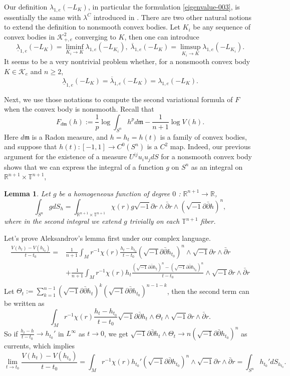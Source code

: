 \documentclass[reqno]{amsart}
\theoremstyle{remark}
\def\cK{{\mathcal K}}
\theoremstyle{plain}
\newtheorem{lemma}[thm]{Lemma}
\newcommand{\ddc}{\sqrt{-1}\partial\bar\partial}
\begin{document}
Our definition $\lambda_{1, e}(-L_K)$, in particular the formulation \eqref{eigenvalue-003}, is essentially the same  with $\lambda^C$ introduced in \cite{Put, Milman22}. There are two other natural notions \cite{KM01, Milman22} to extend the definition to nonsmooth convex bodies. Let $K_i$ be  any sequence of convex bodies in $\cK^2_{+, e}$ converging to $K$, then one can introduce
\[
\underline{\lambda}_{1, e}(-L_K)=\liminf_{K_i\rightarrow K} \lambda_{1, e}(-L_{K_i}),\; \overline{\lambda}_{1, e}(-L_K)=\limsup_{K_i\rightarrow K} \lambda_{1, e}(-L_{K_i}).
\]
It seems to be a very nontrivial problem whether, for a nonsmooth convex body $K\in \cK_e$ and $n\geq 2$,
\[
\underline{\lambda}_{1, e}(-L_K)=\overline{\lambda}_{1, e}(-L_K)=\lambda_{1, e}(-L_K).
\]


Next, we use those notations to compute the second variational formula of $F$ when the convex body is nonsmooth. Recall that $$F_{d\mathfrak{m}}(h):=\frac{1}{p}\log \int_{S^n}h^pd\mathfrak{m}-\frac{1}{n+1}\log V(h).$$ Here $d\mathfrak{m}$ is a Radon measure, and $h=h_t=h(t)$ is a family of convex bodies, and suppose that $h(t):[-1,1]\rightarrow C^0(S^n)$ is a $C^2$ map. Indeed, our previous argument for the existence of a measure $U^{ij}u_iu_jdS$ for a nonsmooth convex body shows that we can express the integral of a function $g$ on $S^n$ as an integral on $\mathbb{R}^{n+1}\times\mathbb{T}^{n+1}$,\begin{lemma}
    Let $g$ be a homogeneous function of degree $0$ : $\mathbb{R}^{n+1}\rightarrow \mathbb{R}$, \[\int_{S^n}gdS_h=\int_{\mathbb{R}^{n+1}\times\mathbb{T}^{n+1}}\chi(r)g\sqrt{-1}\partial r\wedge\bar{\partial}r\wedge(\ddc h)^{n},
\]where in the second integral we extend $g$ trivially on each $\mathbb{T}^{n+1}$ fiber. 
\end{lemma}

Let's prove Aleksandrov's lemma first under our complex language. \[
\begin{aligned}
   \frac{V(h_t)-V(h_{t_0})}{t-t_0}=&\frac{1}{n+1}\int_{M}r^{-1}\chi(r)\frac{h_t-h_{t_0}}{t-t_0}(\ddc h_{t_0})^{n}\wedge\sqrt{-1}\partial{r}\wedge \bar{\partial} r\\
    &+
    \frac{1}{n+1}\int_{M}r^{-1}\chi(r)h_t\frac{(\ddc h_t)^n-(\ddc h_{t_0})^n}{t-t_0}\wedge\sqrt{
    -1}\partial{r}\wedge \bar{\partial} r\\
\end{aligned}
\]
Let $\Theta_t:=\sum_{k=1}^{n-1}(\ddc h_t)^k(\ddc h_{t_0})^{n-1-k}$, then the second term can be written as \[
\int_{M}r^{-1}\chi(r)\frac{h_t-h_{t_0}}{t-t_0}\ddc h_t\wedge\Theta_t\wedge\sqrt{-1}\partial{r}\wedge\bar{\partial}r.
\]
So if $\frac{h_t-h}{t-t_0}\rightarrow h_{t_0}'$ in $L^\infty$ as $t\rightarrow 0$, we get $\ddc h_t\wedge\Theta_t\rightarrow n(\ddc h_{t_0})^n$ as currents, which implies 
\[
\lim_{t\rightarrow t_0}\frac{V(h_t)-V(h_{t_0})}{t-t_0}=\int_{M}r^{-1}\chi(r)h_{t_0}'(\ddc h_{t_0})^n\wedge \sqrt{-1}\partial{r}\wedge \bar{\partial} r=\int_{S^n}h_{t_0}'dS_{h_{t_0}}.
\]
\end{document}
